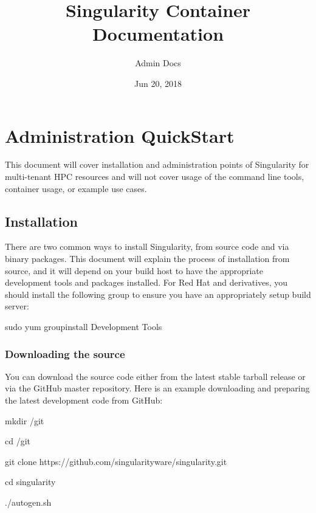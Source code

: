 \documentclass[letterpaper,10pt,english]{sphinxmanual}
\title{Singularity Container Documentation}
\date{Jun 20, 2018}
\author{Admin Docs}
\begin{document}
\maketitle
\sphinxtableofcontents
{}\label{\detokenize{index::doc}}



\chapter{Administration QuickStart}
\label{\detokenize{admin_quickstart:administration-quickstart}}\label{\detokenize{admin_quickstart::doc}}
This document will cover installation and administration points of
Singularity for multi-tenant HPC resources and will not cover usage of
the command line tools, container usage, or example use cases.


\section{Installation}
\label{\detokenize{admin_quickstart:installation}}
There are two common ways to install Singularity, from source code and
via binary packages. This document will explain the process of
installation from source, and it will depend on your build host to have
the appropriate development tools and packages installed. For Red Hat
and derivatives, you should install the following  group to ensure you
have an appropriately setup build server:

%
\begin{sphinxVerbatim}[commandchars=\\\{\}]
\PYGZdl{} sudo yum groupinstall \PYGZdq{}Development Tools\PYGZdq{}
\end{sphinxVerbatim}


\subsection{Downloading the source}
\label{\detokenize{admin_quickstart:downloading-the-source}}
You can download the source code either from the latest stable tarball
release or via the GitHub master repository. Here is an example
downloading and preparing the latest development code from GitHub:

%
\begin{sphinxVerbatim}[commandchars=\\\{\}]
\PYGZdl{} mkdir \PYGZti{}/git

\PYGZdl{} cd \PYGZti{}/git

\PYGZdl{} git clone https://github.com/singularityware/singularity.git

\PYGZdl{} cd singularity

\PYGZdl{} ./autogen.sh
\end{sphinxVerbatim}
\end{document}
